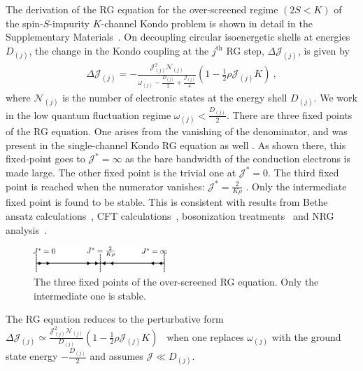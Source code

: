 \documentclass[reprint,prb,superscriptaddress]{revtex4-2}
\begin{document}
The derivation of the RG equation for the over-screened regime \((2S < K)\) of the spin-\(S\)-impurity \(K\)-channel Kondo problem is shown in detail in the Supplementary Materials~\cite{SM}.
On decoupling circular isoenergetic shells at energies \(D_{(j)}\), the change in the Kondo coupling at the \(j^\text{th}\) RG step, \(\Delta {\mathcal{J}}_{(j)}\), is given by
\begin{equation}\begin{aligned}
	\Delta {\mathcal{J}}_{(j)} = -\frac{{\mathcal{J}}_{(j)}^2 \mathcal{N}_{(j)}}{\omega_{(j)} - \frac{D_{(j)}}{2} + \frac{{\mathcal{J}}_{(j)}}{4}}\left( 1 - \frac{1}{2}\rho {\mathcal{J}}_{(j)} K \right)~, 
\end{aligned}\end{equation}
where \(\mathcal{N}_{(j)}\) is the number of electronic states at the energy shell \(D_{(j)}\). We work in the low quantum fluctuation regime \(\omega_{(j)} < \frac{D_{(j)}}{2}\). There are three fixed points of the RG equation. One arises from the vanishing of the denominator, and was present in the single-channel Kondo RG equation as well \cite{kondo_urg}. As shown there, this fixed-point goes to \({\mathcal{J}}^* = \infty\) as the bare bandwidth of the conduction electrons is made large. The other fixed point is the trivial one at \({\mathcal{J}}^* = 0\). The third fixed point is reached when the numerator vanishes: \({\mathcal{J}}^* = \frac{2}{K \rho}\) \cite{Gan_mchannel_1994,Kogan_2018,Kuramoto1998,Noz_blandin_1980}. Only the intermediate fixed point is found to be stable. This is consistent with results from Bethe ansatz calculations~\cite{Tsvelick_Weigmann_mchannel_1984,andrei_destri_1984,zarand_costi_2002,andrei_jerez_1995,Tsvelick_1985,Tsvelick1984}, CFT calculations~\cite{affleck_1991_overscreen,affleck1993exact,affleck_ludwig_1991}, bosonization treatments~\cite{emery_kivelson,vondelft_prl_1998} and NRG analysis~\cite{pang_cox_1991,mitchell_bulla_2014}.
\begin{figure}[htpb]
	\centering
	\includegraphics[width=0.45\textwidth]{rgflow.pdf}
	\caption{The three fixed points of the over-screened RG equation. Only the intermediate one is stable.}
	\label{rg_flow}
\end{figure}

The RG equation reduces to the perturbative form \(\Delta {\mathcal{J}}_{(j)} \simeq \frac{{\mathcal{J}}_{(j)}^2 \mathcal{N}_{(j)}}{D_{(j)}}\left( 1 - \frac{1}{2}\rho {\mathcal{J}}_{(j)} K \right)\)~\cite{Kogan_2018,Kuramoto1998,Noz_blandin_1980,tripathi2018landau} when one replaces \(\omega_{(j)}\) with the ground state energy \(-\frac{D_{(j)}}{2}\) and assumes \({\mathcal{J}} \ll D_{(j)}\).
\end{document}
